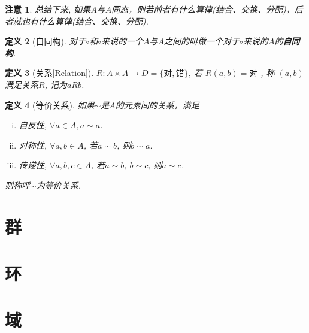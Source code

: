\documentclass[UTF8]{ctexart}
\newtheorem{Definition}{定义}%
\newtheorem{Remark}[Definition]{注意}
\begin{document}
\begin{Remark}
总结下来, 如果$A$与$\bar{A}$同态，则若前者有什么算律(结合、交换、分配)，后者就也有什么算律(结合、交换、分配).
\end{Remark}

\begin{Definition}[自同构]
对于$\circ$和$\circ$来说的一个$A$与$A$之间的\;\;叫做一个对于$\circ$来说的$A$的\textbf{自同构}.
\end{Definition}

\begin{Definition}[关系\mbox{[Relation]}]
$R: A \times A \rightarrow D = \{\text{对}, \text{错}\} $, 
若
$R(a, b) = \text{对}$
, 称
$(a, b)$
满足关系$R$, 记为$aRb$.
\end{Definition}

\begin{Definition}[等价关系]
如果$\sim$是$A$的元素间的关系，满足 
\begin{enumerate}[i)]
\item 自反性, $\forall a \in A, a \sim a$.
\item 对称性, $\forall a, b \in A$, 若$a \sim b$, 则$b \sim a$.
\item 传递性, $\forall a, b, c \in A$, 若$a \sim b$, $b\sim c$, 则$a \sim c$.
\end{enumerate}
则称呼$\sim$为等价关系.
\end{Definition}


\section{群}
\section{环}
\section{域}
\end{document}
